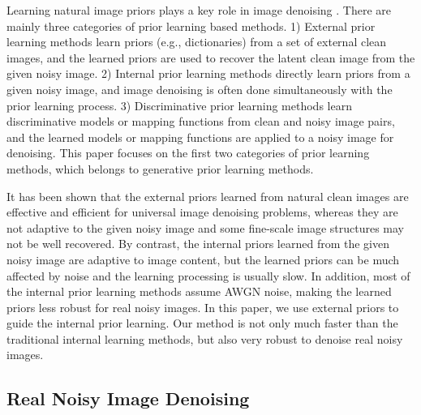 Learning natural image priors plays a key role in image denoising
\cite{blsgsm,
zhou2012nonparametric,ksvd,lssc,ncsr,foe,epll,pgpd,mlp,xie2012image,zhang2017beyond,
barbu2009training,csf,chen2015learning}. There are mainly three categories of prior learning based methods. 1) External prior learning methods \cite{foe,epll,pgpd} learn priors (e.g., dictionaries) from a set of external clean images, and the learned priors are used to recover the latent clean image from the given noisy image. 2) Internal prior learning methods \cite{blsgsm,zhou2012nonparametric,ksvd,lssc,ncsr} directly learn priors from a given noisy image, and image denoising is often done simultaneously with the prior learning process. 3) Discriminative prior learning methods \cite{mlp,xie2012image,zhang2017beyond,barbu2009training,
csf,chen2015learning} learn discriminative models or mapping functions from clean and noisy image pairs, and the learned models or mapping functions are applied to a noisy image for denoising. This paper focuses on the first two categories of prior learning methods, which belongs to generative prior learning methods. 

It has been shown \cite{foe,epll,pgpd} that the external priors learned from natural clean images are effective and efficient for universal image denoising problems, whereas they are not adaptive to the given noisy image and some fine-scale image structures may not be well recovered. By contrast, the internal priors learned from the given noisy image are adaptive to image content, but the learned priors can be much affected by noise and the learning processing is usually slow. In addition, most of the internal prior learning methods \cite{blsgsm,zhou2012nonparametric,ksvd,lssc,ncsr} assume AWGN noise, making the learned priors less robust for real noisy images. In this paper, we use external priors to guide the internal prior learning. Our method is not only much faster than the traditional internal learning methods, but also very robust to denoise real noisy images.


\subsection{Real Noisy Image Denoising}

